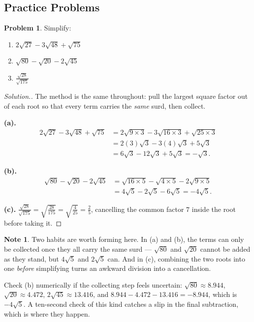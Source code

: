 \documentclass[11pt,a4paper]{article}
\theoremstyle{definition}
\newtheorem{note}[thm]{Note}
\newtheorem{problemx}{Problem}[section]
\newenvironment{problem}{\begin{problemx}}{\end{problemx}}
\newenvironment{solution}
  {\renewcommand{\qedsymbol}{}\begin{proof}[\textit{Solution}.]}
  {\end{proof}}
\begin{document}
\subsection{Practice Problems}

\begin{problem}
Simplify:
\begin{enumerate}
\item[(a).] $2\sqrt{27}-3\sqrt{48}+\sqrt{75}$
\item[(b).] $\sqrt{80}-\sqrt{20}-2\sqrt{45}$
\item[(c).] $\frac{\sqrt{28}}{\sqrt{175}}$
\end{enumerate}
\end{problem}

\begin{solution}
The method is the same throughout: pull the largest square factor out of each root
so that every term carries the \emph{same} surd, then collect.

\textbf{(a).}
\begin{align*}
2\sqrt{27}-3\sqrt{48}+\sqrt{75}
 &= 2\sqrt{9\times 3}-3\sqrt{16\times 3}+\sqrt{25\times 3}\\
 &= 2(3)\sqrt{3}-3(4)\sqrt{3}+5\sqrt{3}\\
 &= 6\sqrt{3}-12\sqrt{3}+5\sqrt{3}=-\sqrt{3}.
\end{align*}

\textbf{(b).}
\begin{align*}
\sqrt{80}-\sqrt{20}-2\sqrt{45}
 &= \sqrt{16\times 5}-\sqrt{4\times 5}-2\sqrt{9\times 5}\\
 &= 4\sqrt{5}-2\sqrt{5}-6\sqrt{5}=-4\sqrt{5}.
\end{align*}

\textbf{(c).} $\frac{\sqrt{28}}{\sqrt{175}}=\sqrt{\frac{28}{175}}
=\sqrt{\frac{4}{25}}=\frac{2}{5}$, cancelling the common factor $7$ inside the
root before taking it.
\end{solution}

\begin{note}
Two habits are worth forming here. In (a) and (b), the terms can only be collected
once they all carry the same surd --- $\sqrt{80}$ and $\sqrt{20}$ cannot be added as
they stand, but $4\sqrt{5}$ and $2\sqrt{5}$ can. And in (c), combining the two
roots into one \emph{before} simplifying turns an awkward division into a
cancellation.

Check (b) numerically if the collecting step feels uncertain:
$\sqrt{80}\approx 8.944$, $\sqrt{20}\approx 4.472$, $2\sqrt{45}\approx 13.416$, and
$8.944-4.472-13.416=-8.944$, which is $-4\sqrt{5}$. A ten-second check of this kind
catches a slip in the final subtraction, which is where they happen.
\end{note}
\end{document}
